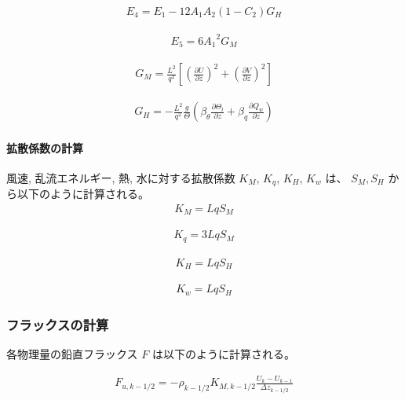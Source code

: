 \begin{eqnarray}E_4=E_1-12A_1A_2(1-C_2)G_H\end{eqnarray}

\begin{eqnarray}E_5=6{A_1}^2G_M\end{eqnarray}

\begin{eqnarray}G_M=\frac{L^2}{q^2}\left[\left(\frac{\partial U}{\partial z}\right)^2+\left(\frac{\partial V}{\partial z}\right)^2\right]\end{eqnarray}

\begin{eqnarray}G_H=-\frac{L^2}{q^2}\frac{g}{\Theta}\left(\beta_\theta \frac{\partial \Theta_l}{\partial z}+\beta_q \frac{\partial Q_w}{\partial z}\right)\end{eqnarray}

\hypertarget{ux62e1ux6563ux4fc2ux6570ux306eux8a08ux7b97-1}{%
\paragraph{拡散係数の計算}\label{ux62e1ux6563ux4fc2ux6570ux306eux8a08ux7b97-1}}

風速, 乱流エネルギー, 熱, 水に対する拡散係数 \(K_M\), \(K_q\), \(K_H\),
\(K_w\) は、 \(S_M,S_H\) から以下のように計算される。 \begin{eqnarray}K_M=LqS_M\end{eqnarray}

\begin{eqnarray}K_q=3LqS_M\end{eqnarray}

\begin{eqnarray}K_H=LqS_H\end{eqnarray}

\begin{eqnarray}K_w=LqS_H\end{eqnarray}

\hypertarget{ux30d5ux30e9ux30c3ux30afux30b9ux306eux8a08ux7b97}{%
\subsubsection{フラックスの計算}\label{ux30d5ux30e9ux30c3ux30afux30b9ux306eux8a08ux7b97}}

各物理量の鉛直フラックス \(F\) は以下のように計算される。

\begin{eqnarray}F_{u,k-1/2}=-\rho_{k-1/2}K_{M,k-1/2}\frac{U_{k}-U_{k-1}}{\Delta z_{k-1/2}}\end{eqnarray}

